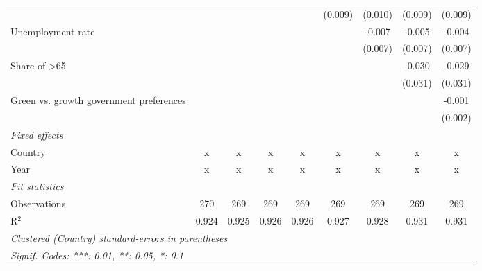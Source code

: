 \begin{table}[htbp]
\begin{tabular}{lcccccccc}
                                                                              &         &         &         &         & (0.009) & (0.010) & (0.009)      & (0.009)\\   
      Unemployment rate                                                       &         &         &         &         &         & -0.007  & -0.005       & -0.004\\   
                                                                              &         &         &         &         &         & (0.007) & (0.007)      & (0.007)\\   
      Share of >65                                                            &         &         &         &         &         &         & -0.030       & -0.029\\   
                                                                              &         &         &         &         &         &         & (0.031)      & (0.031)\\   
      Green vs. growth government preferences                                 &         &         &         &         &         &         &              & -0.001\\   
                                                                              &         &         &         &         &         &         &              & (0.002)\\   
      \emph{Fixed effects}\\
      Country                                                                 & x       & x       & x       & x       & x       & x       & x            & x\\  
      Year                                                                    & x       & x       & x       & x       & x       & x       & x            & x\\  
      \midrule \emph{Fit statistics}\\
      Observations                                                            & 270     & 269     & 269     & 269     & 269     & 269     & 269          & 269\\  
      R$^2$                                                                   & 0.924   & 0.925   & 0.926   & 0.926   & 0.927   & 0.928   & 0.931        & 0.931\\  
      \midrule
      \multicolumn{9}{l}{\emph{Clustered (Country) standard-errors in parentheses}}\\
      \multicolumn{9}{l}{\emph{Signif. Codes: ***: 0.01, **: 0.05, *: 0.1}}\\
   \end{tabular}
\end{table}


